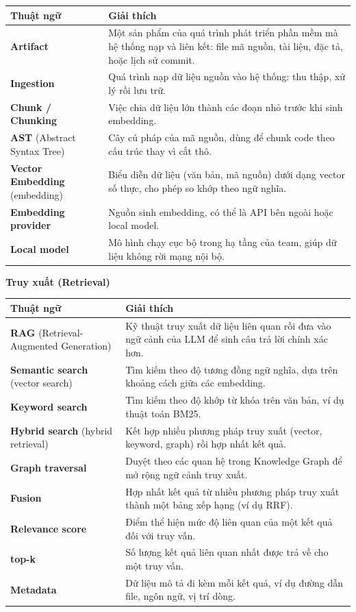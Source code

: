 \begin{table}[H]
\centering
\begin{tabular}{p{3cm}p{12cm}}
\toprule
Thuật ngữ & Giải thích \\
\midrule
\textbf{Artifact} & Một sản phẩm của quá trình phát triển phần mềm mà hệ thống nạp và liên kết: file mã nguồn, tài liệu, đặc tả, hoặc lịch sử commit. \\
\textbf{Ingestion} & Quá trình nạp dữ liệu nguồn vào hệ thống: thu thập, xử lý rồi lưu trữ. \\
\textbf{Chunk / Chunking} & Việc chia dữ liệu lớn thành các đoạn nhỏ trước khi sinh embedding. \\
\textbf{AST} (Abstract Syntax Tree) & Cây cú pháp của mã nguồn, dùng để chunk code theo cấu trúc thay vì cắt thô. \\
\textbf{Vector Embedding} (embedding) & Biểu diễn dữ liệu (văn bản, mã nguồn) dưới dạng vector số thực, cho phép so khớp theo ngữ nghĩa. \\
\textbf{Embedding provider} & Nguồn sinh embedding, có thể là API bên ngoài hoặc local model. \\
\textbf{Local model} & Mô hình chạy cục bộ trong hạ tầng của team, giúp dữ liệu không rời mạng nội bộ. \\
\bottomrule
\end{tabular}
\end{table}

\textbf{Truy xuất (Retrieval)}

\begin{table}[H]
\centering
\begin{tabular}{p{3cm}p{12cm}}
\toprule
Thuật ngữ & Giải thích \\
\midrule
\textbf{RAG} (Retrieval-Augmented Generation) & Kỹ thuật truy xuất dữ liệu liên quan rồi đưa vào ngữ cảnh của LLM để sinh câu trả lời chính xác hơn. \\
\textbf{Semantic search} (vector search) & Tìm kiếm theo độ tương đồng ngữ nghĩa, dựa trên khoảng cách giữa các embedding. \\
\textbf{Keyword search} & Tìm kiếm theo độ khớp từ khóa trên văn bản, ví dụ thuật toán BM25. \\
\textbf{Hybrid search} (hybrid retrieval) & Kết hợp nhiều phương pháp truy xuất (vector, keyword, graph) rồi hợp nhất kết quả. \\
\textbf{Graph traversal} & Duyệt theo các quan hệ trong Knowledge Graph để mở rộng ngữ cảnh truy xuất. \\
\textbf{Fusion} & Hợp nhất kết quả từ nhiều phương pháp truy xuất thành một bảng xếp hạng (ví dụ RRF). \\
\textbf{Relevance score} & Điểm thể hiện mức độ liên quan của một kết quả đối với truy vấn. \\
\textbf{top-k} & Số lượng kết quả liên quan nhất được trả về cho một truy vấn. \\
\textbf{Metadata} & Dữ liệu mô tả đi kèm mỗi kết quả, ví dụ đường dẫn file, ngôn ngữ, vị trí dòng. \\
\bottomrule
\end{tabular}
\end{table}

